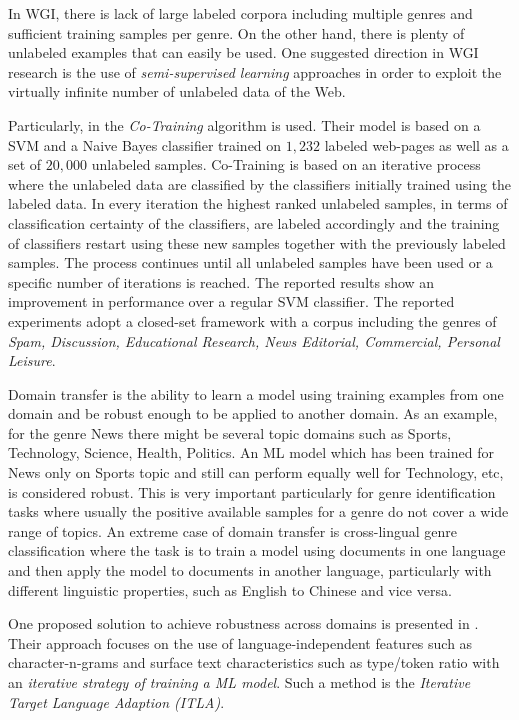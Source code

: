 In WGI, there is lack of large labeled corpora including multiple genres and sufficient training samples per genre. On the other hand, there is plenty of unlabeled examples that can easily be used. One suggested direction in WGI research is the use of \textit{semi-supervised learning} approaches in order to exploit the virtually infinite number of unlabeled data of the Web. 

Particularly, in \parencite{chetry2011web} the \textit{Co-Training} algorithm is used. Their model is based on a SVM and a Naive Bayes classifier trained on $1,232$ labeled web-pages as well as a set of $20,000$ unlabeled samples. Co-Training is based on an iterative process where the unlabeled data are classified by the classifiers initially trained using the labeled data. In every iteration the highest ranked unlabeled samples, in terms of classification certainty of the classifiers, are labeled accordingly and the training of classifiers restart using these new samples together with the previously labeled samples. The process continues until all unlabeled samples have been used or a specific number of iterations is reached. The reported results show an improvement in performance over a regular SVM classifier. The reported experiments adopt a closed-set framework with a corpus including the genres of \textit{Spam, Discussion, Educational Research, News Editorial, Commercial, Personal Leisure}.

Domain transfer is the ability to learn a model using training examples from one domain and be robust enough to be applied to another domain. As an example, for the genre News there might be several topic domains such as Sports, Technology, Science, Health, Politics. An ML model which has been trained for News only on Sports topic and still can perform equally well for Technology, etc, is considered robust. This is very important particularly for genre identification tasks where usually the positive available samples for a genre do not cover a wide range of topics. An extreme case of domain transfer is cross-lingual genre classification where the task is to train a model using documents in one language and then apply the model to documents in another language, particularly with different linguistic properties, such as English to Chinese and vice versa.

One proposed solution to achieve robustness across domains is presented in \parencite{petrenz2011stable}. Their approach focuses on the use of language-independent features such as character-n-grams and surface text characteristics such as type/token ratio with an \textit{iterative strategy of training a ML model}. Such a method is the \textit{Iterative Target Language Adaption (ITLA)}. 

